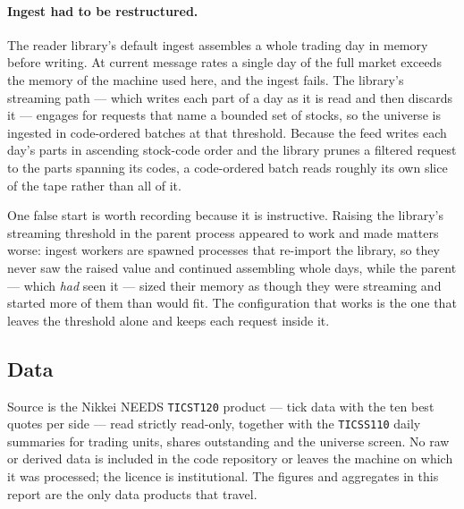 \paragraph{Ingest had to be restructured.}
The reader library's default ingest assembles a whole trading day in memory
before writing. At current message rates a single day of the full market exceeds
the memory of the machine used here, and the ingest fails. The library's
streaming path --- which writes each part of a day as it is read and then
discards it --- engages for requests that name a bounded set of stocks, so the
universe is ingested in code-ordered batches at that threshold. Because the feed
writes each day's parts in ascending stock-code order and the library prunes a
filtered request to the parts spanning its codes, a code-ordered batch reads
roughly its own slice of the tape rather than all of it.

One false start is worth recording because it is instructive. Raising the
library's streaming threshold in the parent process appeared to work and made
matters worse: ingest workers are spawned processes that re-import the library,
so they never saw the raised value and continued assembling whole days, while the
parent --- which \emph{had} seen it --- sized their memory as though they were
streaming and started more of them than would fit. The configuration that works
is the one that leaves the threshold alone and keeps each request inside it.

\subsection{Data}

Source is the Nikkei NEEDS \texttt{TICST120} product --- tick data with
the ten best quotes per side --- read strictly read-only, together with the
\texttt{TICSS110} daily summaries for trading units, shares outstanding and the
universe screen. No raw or derived data is included in the code repository or
leaves the machine on which it was processed; the licence is institutional. The
figures and aggregates in this report are the only data products that travel.
